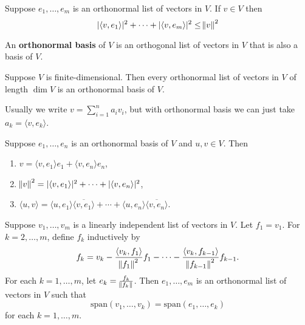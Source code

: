 \documentclass{extarticle}
\begin{document}
\begin{thm}
    Suppose \(e_1, \ldots, e_m\) is an orthonormal list of vectors in \(V\). If \(v \in V\) then 
    \[ |\langle v,e_1 \rangle|^2 + \cdots + |\langle v,e_m \rangle|^2 \leq \norm{v}^2\]
\end{thm}


\begin{definition}
    An \textbf{orthonormal basis} of \(V\) is an orthogonal list of vectors in \(V\) that is 
    also a basis of \(V\).
\end{definition}

\begin{corollary}
    Suppose \(V\) is finite-dimensional. Then every orthonormal list of vectors in \(V\)
    of length \(\dim V\) is an orthonormal basis of \(V\).
\end{corollary}

\begin{remark}
    Usually we write \(v = \sum_{i=1}^{n} a_i v_i\), but with orthonormal basis we can just 
    take \(a_k = \langle v,e_k \rangle\).
\end{remark}

\begin{lemma}
    Suppose \(e_1, \ldots, e_n\) is an orthonormal basis of \(V\) and \(u, v \in V\). Then 
    \begin{enumerate}[label=(\alph*)]
        \item \(v = \langle v,e_1 \rangle e_1 + \langle v,e_n \rangle e_n\), 
        \item \(\norm{v}^2 = |\langle v,e_1 \rangle|^2 + \cdots + |\langle v,e_n \rangle|^2\), 
        \item \(\langle u,v \rangle = \langle u,e_1 \rangle \overline{\langle v, e_1 \rangle} + \cdots + \langle u,e_n \rangle 
        \overline{\langle v,e_n \rangle}\).
    \end{enumerate}
\end{lemma}


\begin{thm}
    Suppose \(v_1, \ldots, v_m\) is a linearly independent list of vectors in \(V\). Let \(f_1 = v_1\). 
    For \(k = 2, \ldots, m\), define \(f_k\) inductively by 
    \[f_k = v_k - \frac{\langle v_k,f_1 \rangle}{\norm{f_1}^2}f_1 - \cdots - \frac{\langle v_k, f_{k-1} \rangle}{\norm{f_{k-1}}^2}f_{k-1}.\]
    For each \(k = 1,\ldots, m\), let \(e_k = \frac{f_k}{\norm{f_k}}\). Then \(e_1, \ldots, e_m\) is an 
    orthonormal list of vectors in \(V\) such that 
    \[\text{span}(v_1, \ldots, v_k) = \text{span}(e_1, \ldots, e_k)\]
    for each \(k = 1, \ldots, m\).
\end{thm}
\end{document}
